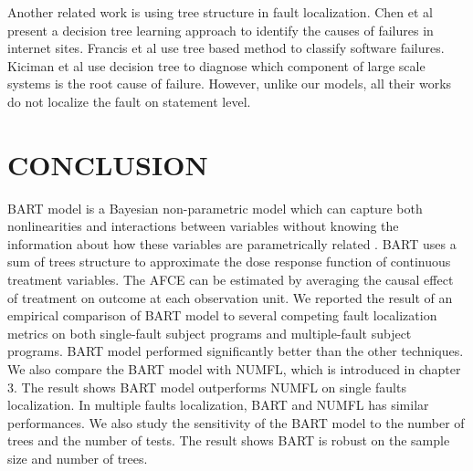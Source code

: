 Another related work is using tree structure in fault localization. Chen et al \cite{chen2004failure} present a decision tree learning approach to identify the causes of failures in internet sites. Francis et al \cite{francis2004tree} use tree based method to classify software failures. Kiciman et al \cite{kiciman2005root} use decision tree to diagnose which component of large scale systems is the root cause of failure. However, unlike our models, all their works do not localize the fault on statement level.

\section{CONCLUSION}\label{BARTconclusion}
BART model is a Bayesian non-parametric model which can capture both nonlinearities and interactions between variables without knowing the information about how these variables are parametrically related . BART uses a sum of trees structure to approximate the dose response function of continuous treatment variables. The AFCE can be estimated by averaging the causal effect of treatment on outcome at each observation unit. We reported the result of an empirical comparison of BART model to several competing fault localization metrics on both single-fault subject programs and multiple-fault subject programs. BART model performed significantly better than the other techniques. We also compare the BART model with NUMFL, which is introduced in chapter 3. The result shows BART model outperforms NUMFL on single faults localization. In multiple faults localization, BART and NUMFL has similar performances.  We also study the sensitivity of the BART model to the number of trees and the number of tests. The result shows BART is robust on the sample size and number of trees.   